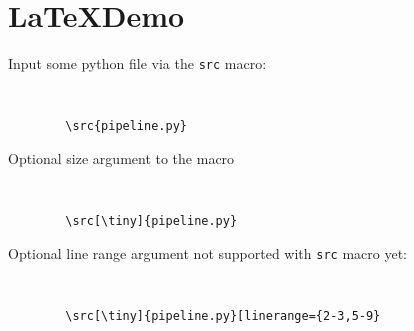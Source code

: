 \documentclass[a4paper,12pt]{report}
\begin{document}
\section{\LaTeX Demo}

Input some python file via the {\tt src} macro:

{\tt 
	\begin{verbatim}
		\src{pipeline.py}
	\end{verbatim}
}


Optional size argument to the macro 

{\tt 
	\begin{verbatim} 
		\src[\tiny]{pipeline.py} 
	\end{verbatim} 
}


Optional line range argument not supported with {\tt src} macro yet:

{\tt 
	\begin{verbatim}
		\src[\tiny]{pipeline.py}[linerange={2-3,5-9}
	\end{verbatim}
}
\end{document}
